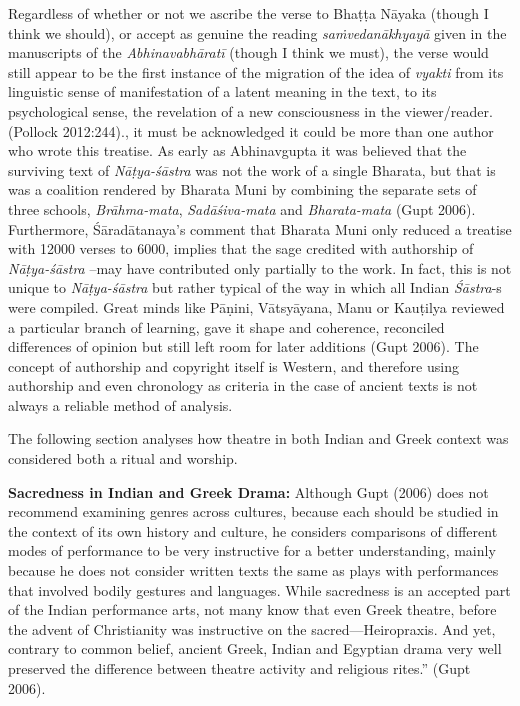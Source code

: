 {Regardless of whether or not we ascribe the verse to Bhaṭṭa Nāyaka (though I think we should), or accept as genuine the reading \textsl{saṁvedanākhyayā} given in the manuscripts of the \textsl{Abhinavabhāratī} (though I think we must), the verse would still appear to be the first instance of the migration of the idea of \textsl{vyakti} from its linguistic sense of manifestation of a latent meaning in the text, to its psychological sense, the revelation of a new consciousness in the viewer/reader. (Pollock 2012:244).}, it must be acknowledged it could be more than one author who wrote this treatise. As early as Abhinavgupta it was believed that the surviving text of \textsl{Nāṭya-śāstra} was not the work of a single Bharata, but that is was a coalition rendered by Bharata Muni by combining the separate sets of three schools, \textsl{Brāhma-mata}, \textsl{Sadāśiva-mata} and \textsl{Bharata-mata} (Gupt 2006). Furthermore, Śāradātanaya’s comment that Bharata Muni only reduced a treatise with 12000 verses to 6000, implies that the sage credited with authorship of \textsl{Nāṭya-śāstra} --may have contributed only partially to the work. In fact, this is not unique to \textsl{Nāṭya-śāstra} but rather typical of the way in which all Indian \textsl{Śāstra}-s were compiled. Great minds like Pāṇini, Vātsyāyana, Manu or Kauṭilya reviewed a particular branch of learning, gave it shape and coherence, reconciled differences of opinion but still left room for later additions (Gupt 2006). The concept of authorship and copyright itself is Western, and therefore using authorship and even chronology as criteria in the case of ancient texts is not always a reliable method of analysis. 

The following section analyses how theatre in both Indian and Greek context was considered both a ritual and worship. 

\textbf{Sacredness in Indian and Greek Drama:} Although Gupt (2006) does not recommend examining genres across cultures, because each should be studied in the context of its own history and culture, he considers comparisons of different modes of performance to be very instructive for a better understanding, mainly because he does not consider written texts the same as plays with performances that involved bodily gestures and languages. While sacredness is an accepted part of the Indian performance arts, not many know that even Greek theatre, before the advent of Christianity was instructive on the sacred---Heiropraxis. And yet, contrary to common belief, ancient Greek, Indian and Egyptian drama very well preserved the difference between theatre activity and religious rites.” (Gupt 2006).

